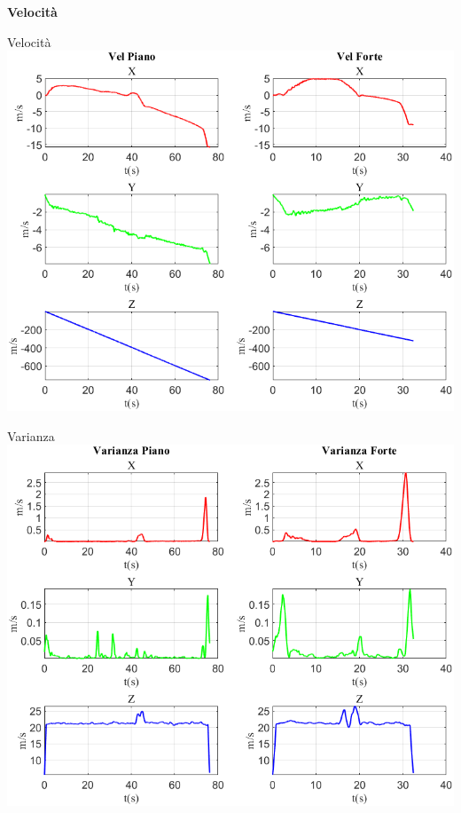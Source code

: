 \documentclass[beamer]{standalone}
\begin{document}
	\begin{frame}
		\color{blue}\centering\Huge{\textbf{Velocità}}	
	\end{frame}
	
	\begin{frame}{{Velocità}}
		\centering\includegraphics[height=.8\textheight]{figure/Vel/Vel}
	\end{frame}
	
	
	
	\begin{frame}{{Varianza}}
		\centering\includegraphics[height=.8\textheight]{figure/Vel/Varianza}
	\end{frame}
	
\end{document}
